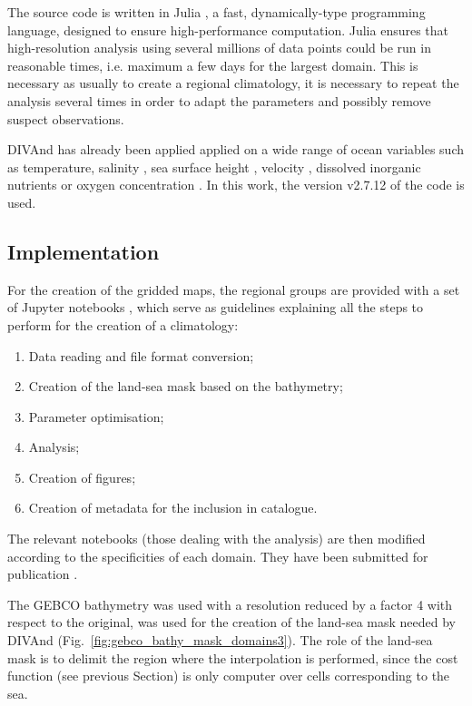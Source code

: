 \documentclass[essd, manuscript]{copernicus}
\begin{document}
The source code is written in Julia \citep{Bezanson2017}, a fast, dynamically-type programming language, designed to ensure high-performance computation. Julia ensures that high-resolution analysis using several millions of data points could be run in reasonable times, i.e. maximum a few days for the largest domain. This is necessary as usually to create a regional climatology, it is necessary to repeat the analysis several times in order to adapt the parameters and possibly remove suspect observations.

DIVAnd has already been applied applied on a wide range of ocean variables such as temperature, salinity \citep{COATANOAN2021}, sea surface height \citep{DOGLIONI2023}, velocity \citep{TROUPIN2022}, dissolved inorganic nutrients \citep{BELGACEM2021} or oxygen concentration \citep{CLIMATO2023}. In this work, the version v2.7.12 of the code \citep{BARTH2024DIVAnd} is used.

\subsection{Implementation}

For the creation of the gridded maps, the regional groups are provided with a set of Jupyter notebooks \citep[https://jupyter.org][]{KLUYVER2016}, which serve as guidelines explaining all the steps to perform for the creation of a climatology:
\begin{enumerate}
\item Data reading and file format conversion;
\item Creation of the land-sea mask based on the bathymetry;
\item Parameter optimisation;
\item Analysis;
\item Creation of figures;
\item Creation of metadata for the inclusion in catalogue.
\end{enumerate}
The relevant notebooks (those dealing with the analysis) are then modified according to the specificities of each domain. They have been submitted for publication \citep{TROUPIN2025}.

The GEBCO bathymetry \citep[2021 grid,][]{GEBCO2021} was used with a resolution reduced by a factor 4 with respect to the original, was used for the creation of the land-sea mask
needed by DIVAnd (Fig.~\ref{fig:gebco_bathy_mask_domains3}). The role of the land-sea mask is to delimit the region where the interpolation is performed, since the cost function (see previous Section) is only computer over cells corresponding to the sea.  
\end{document}
